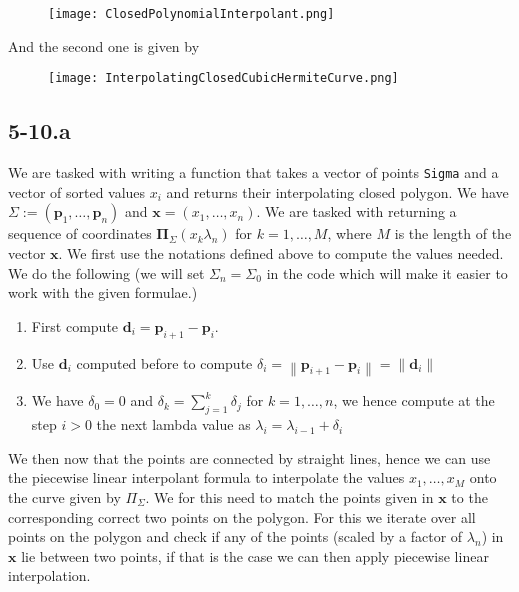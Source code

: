\documentclass{article}
\begin{document}
\begin{figure}[!hbt]
    \centering
\texttt{[image: ClosedPolynomialInterpolant.png]}
\end{figure}

\noindent And the second one is given by

\begin{figure}[!hbt]
    \centering
\texttt{[image: InterpolatingClosedCubicHermiteCurve.png]}
\end{figure}

\subsection*{5-10.a}
We are tasked with writing a function that takes a vector of points \verb|Sigma| and a vector of sorted values $x_{i}$ and returns their interpolating closed polygon. We have $\Sigma := \left(\mathbf{p}_{1}, \dots, \mathbf{p}_{n}\right)$ and $\mathbf{x} = \left(x_{1}, \dots, x_{n}\right)$. We are tasked with returning a sequence of coordinates $\mathbf{\Pi}_{\Sigma}\left(x_{k} \lambda_{n}\right)$ for $k = 1, \dots, M$, where $M$ is the length of the vector $\mathbf{x}$. We first use the notations defined above to compute the values needed. We do the following (we will set $\Sigma_{n} = \Sigma_{0}$ in the code which will make it easier to work with the given formulae.)
\begin{enumerate}
    \item First compute $\mathbf{d}_{i} = \mathbf{p}_{i+1} - \mathbf{p}_{i}$.
    \item Use $\mathbf{d}_{i}$ computed before to compute $\delta_{i} = \left\lVert \mathbf{p}_{i+1} - \mathbf{p}_{i} \right\rVert = \left\lVert \mathbf{d}_{i}
    \right\rVert$
    \item We have $\delta_{0} = 0$ and $\delta_{k} = \sum_{j=1}^{k}\delta_{j}$ for $k = 1, \dots, n$, we hence compute at the step $i > 0$ the next lambda value as $\lambda_{i} = \lambda_{i-1} + \delta_{i}$
\end{enumerate}
We then now that the points are connected by straight lines, hence we can use the piecewise linear interpolant formula to interpolate the values $x_{1}, \dots, x_{M}$ onto the curve given by $\Pi_{\Sigma}$. We for this need to match the points given in $\mathbf{x}$ to the corresponding correct two points on the polygon. For this we iterate over all points on the polygon and check if any of the points (scaled by a factor of $\lambda_{n}$) in $\mathbf{x}$ lie between two points, if that is the case we can then apply piecewise linear interpolation. 
\end{document}
